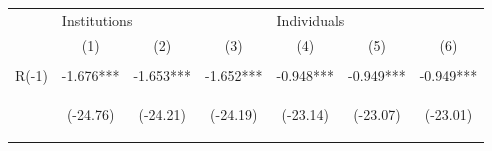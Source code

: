 \documentclass[border=0.2cm]{standalone}
\begin{document}
\begin{tabular}{lcccccc}
                           & \multicolumn{3}{l}{Institutions}               & \multicolumn{3}{l}{Individuals}                                                                                                                                                                                                                    \\
    \cmidrule(l){2-4} \cmidrule(l){5-7}
                           & (1)                                            & (2)                                            & (3)                                            & (4)                                            & (5)                                            & (6)                                            \\
    \toprule
    \vspace{2pt}           & \begin{footnotesize}\end{footnotesize}         & \begin{footnotesize}\end{footnotesize}         & \begin{footnotesize}\end{footnotesize}         & \begin{footnotesize}\end{footnotesize}         & \begin{footnotesize}\end{footnotesize}         & \begin{footnotesize}\end{footnotesize}         \\
    R(-1)                  & -1.676***                                      & -1.653***                                      & -1.652***                                      & -0.948***                                      & -0.949***                                      & -0.949***                                      \\
    \vspace{4pt}           & \begin{footnotesize}(-24.76)\end{footnotesize} & \begin{footnotesize}(-24.21)\end{footnotesize} & \begin{footnotesize}(-24.19)\end{footnotesize} & \begin{footnotesize}(-23.14)\end{footnotesize} & \begin{footnotesize}(-23.07)\end{footnotesize} & \begin{footnotesize}(-23.01)\end{footnotesize} \\

\end{tabular}
\end{document}
